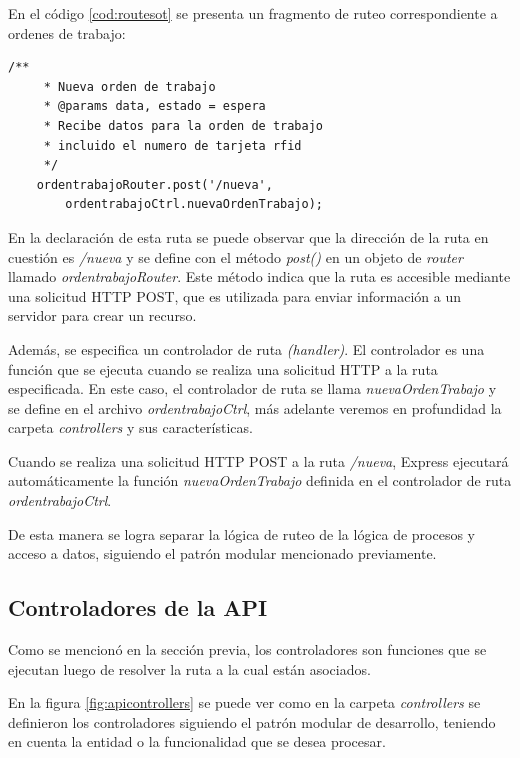 En el código \ref{cod:routesot} se presenta un fragmento de ruteo correspondiente a ordenes de trabajo:


\begin{lstlisting}[label=cod:routesot,caption=Código de ruteo para ordenes de trabajo.]
    /**
     * Nueva orden de trabajo
     * @params data, estado = espera
     * Recibe datos para la orden de trabajo
     * incluido el numero de tarjeta rfid
     */
    ordentrabajoRouter.post('/nueva',
        ordentrabajoCtrl.nuevaOrdenTrabajo);
\end{lstlisting}

En la declaración de esta ruta se puede observar que la dirección de la ruta en cuestión es \textit{/nueva} y se define con el método \textit{post()} en un objeto de \textit{router} llamado \textit{ordentrabajoRouter}. Este método indica que la ruta es accesible mediante una solicitud HTTP POST, que es utilizada para enviar información a un servidor para crear un recurso.

Además, se especifica un controlador de ruta \textit{(handler)}. El controlador es una función que se ejecuta cuando se realiza una solicitud HTTP a la ruta especificada. En este caso, el controlador de ruta se llama \textit{nuevaOrdenTrabajo} y se define en el archivo \textit{ordentrabajoCtrl}, más adelante veremos en profundidad la carpeta \textit{controllers} y sus características.

Cuando se realiza una solicitud HTTP POST a la ruta \textit{/nueva}, Express ejecutará automáticamente la función \textit{nuevaOrdenTrabajo} definida en el controlador de ruta \textit{ordentrabajoCtrl}.

De esta manera se logra separar la lógica de ruteo de la lógica de procesos y acceso a datos, siguiendo el patrón modular mencionado previamente.

\subsection{Controladores de la API}
\label{subsec:apicontrollers}

Como se mencionó en la sección previa, los controladores son funciones que se ejecutan luego de resolver la ruta a la cual están asociados. 

En la figura \ref{fig:apicontrollers} se puede ver como en la carpeta \textit{controllers} se definieron los controladores siguiendo el patrón modular de desarrollo, teniendo en cuenta la entidad o la funcionalidad que se desea procesar.

